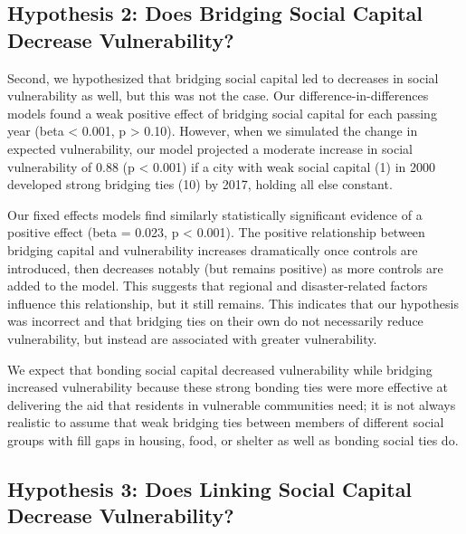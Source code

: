 \documentclass[]{elsarticle} %
\begin{document}
\hypertarget{hypothesis-2-does-bridging-social-capital-decrease-vulnerability}{%
\subsection{Hypothesis 2: Does Bridging Social Capital Decrease
Vulnerability?}\label{hypothesis-2-does-bridging-social-capital-decrease-vulnerability}}

Second, we hypothesized that bridging social capital led to decreases in
social vulnerability as well, but this was not the case. Our
difference-in-differences models found a weak positive effect of
bridging social capital for each passing year (beta \textless{} 0.001, p
\textgreater{} 0.10). However, when we simulated the change in expected
vulnerability, our model projected a moderate increase in social
vulnerability of 0.88 (p \textless{} 0.001) if a city with weak social
capital (1) in 2000 developed strong bridging ties (10) by 2017, holding
all else constant.

Our fixed effects models find similarly statistically significant
evidence of a positive effect (beta = 0.023, p \textless{} 0.001). The
positive relationship between bridging capital and vulnerability
increases dramatically once controls are introduced, then decreases
notably (but remains positive) as more controls are added to the model.
This suggests that regional and disaster-related factors influence this
relationship, but it still remains. This indicates that our hypothesis
was incorrect and that bridging ties on their own do not necessarily
reduce vulnerability, but instead are associated with greater
vulnerability.

We expect that bonding social capital decreased vulnerability while
bridging increased vulnerability because these strong bonding ties were
more effective at delivering the aid that residents in vulnerable
communities need; it is not always realistic to assume that weak
bridging ties between members of different social groups with fill gaps
in housing, food, or shelter as well as bonding social ties do.

\hypertarget{hypothesis-3-does-linking-social-capital-decrease-vulnerability}{%
\subsection{Hypothesis 3: Does Linking Social Capital Decrease
Vulnerability?}\label{hypothesis-3-does-linking-social-capital-decrease-vulnerability}}
\end{document}
